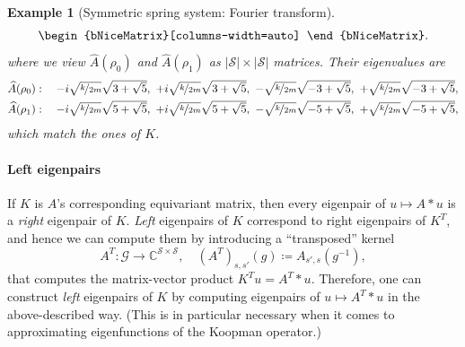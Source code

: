 \documentclass[preprint,12pt,authoryear]{elsarticle}
\newcommand{\C}{\mathbb{C}}
\newcommand{\Fourier}[1]{\widehat{#1}}
\newcommand\Gc{\mathcal G}
\newcommand\Sc{\mathcal S}
\newtheorem{example}{Example}[section]%
\begin{document}
{\begin{example}[Symmetric spring system: Fourier transform]
\begin{align*}
\begin{bNiceMatrix}[columns-width=auto]
        \end{bNiceMatrix}.
    \end{align*}
    where we view $\Fourier{A}(\rho_0)$ and $\Fourier{A}(\rho_1)$ as $|\Sc| \times |\Sc|$ matrices. Their eigenvalues are
    \begin{align*}
        &\textstyle
        \Fourier{A}(\rho_0): \quad - i \sqrt{\nicefrac k {2m}} \sqrt{3 + \sqrt{5}},\ 
        + i \sqrt{\nicefrac k {2m}} \sqrt{3 + \sqrt{5}},\ 
        - \sqrt{\nicefrac k {2m}} \sqrt{-3 + \sqrt{5}},\ 
        + \sqrt{\nicefrac k {2m}} \sqrt{-3 + \sqrt{5}}, \\
        &\textstyle
        \Fourier{A}(\rho_1): \quad - i \sqrt{\nicefrac k {2m}} \sqrt{5 + \sqrt{5}},\ 
        + i \sqrt{\nicefrac k {2m}} \sqrt{5 + \sqrt{5}},\ 
        - \sqrt{\nicefrac k {2m}} \sqrt{-5 + \sqrt{5}},\ 
        + \sqrt{\nicefrac k {2m}} \sqrt{-5 + \sqrt{5}},
    \end{align*}
    which match the ones of $K$.
\end{example}


\paragraph{Left eigenpairs}
If $K$ is $A$'s corresponding equivariant matrix, then every eigenpair of $u \mapsto A * u$ is a \emph{right} eigenpair of $K$. \emph{Left} eigenpairs of $K$ correspond to right eigenpairs of $K^T$, and hence we can compute them by introducing a ``transposed'' kernel
$$
    A^T : \Gc \rightarrow \C^{\Sc \times \Sc}, \quad (A^T)_{s,s'}(g) \coloneqq A_{s',s}(g^{-1}),
$$
that computes the matrix-vector product $K^T u = A^T * u$. Therefore, one can construct \emph{left} eigenpairs of $K$ by computing eigenpairs of $u \mapsto A^T * u$ in the above-described way. (This is in particular necessary when it comes to approximating eigenfunctions of the Koopman operator.)
\\
}
\end{document}
